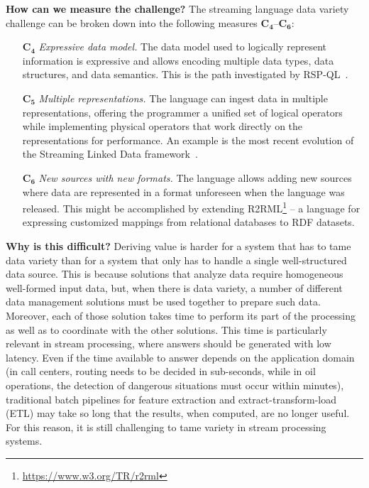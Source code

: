 \textbf{How can we measure the challenge?}
%
The streaming language data variety challenge can be broken down
into the following measures $\mathbf{C_4}$--$\mathbf{C_6}$:

\begin{itemize}[leftmargin=6mm]
  \item[$\mathbf{C_4}$] \emph{Expressive data model.}  The data model
    used to logically represent information is expressive and allows
    encoding multiple data types, data structures, and data
    semantics. This is the path investigated by
    RSP-QL~\cite{DellAglioDataScience2017,DBLP:conf/debs/ValleDM16}.
  \item[$\mathbf{C_5}$] \emph{Multiple representations.} The language
    can ingest data in multiple representations, offering the
    programmer a unified set of logical operators while implementing
    physical operators that work directly on the representations for
    performance. An example is the most recent evolution of the
    Streaming Linked Data framework~\cite{DBLP:conf/esws/BalduiniV017a}.
  \item[$\mathbf{C_6}$] \emph{New sources with new formats.} The
    language allows adding new sources where data are represented in a
    format unforeseen when the language was
    released. This might be accomplished by extending
    R2RML\footnote{\url{https://www.w3.org/TR/r2rml}} -- a language
    for expressing customized mappings from relational databases to
    RDF datasets.
\end{itemize}

\textbf{Why is this difficult?}
%
Deriving value is harder for a system that has to tame data variety
than for a system that only has to handle a single well-structured
data source. This is because solutions that analyze data require
homogeneous well-formed input data, but, when there is data variety,
a number of different data management solutions must be used together
to prepare such data. Moreover, each of those solution takes time to
perform its part of the processing as well as to coordinate with the
other solutions. This time is particularly relevant in stream
processing, where answers should be generated with low latency. Even
if the time available to answer depends on the application domain (in
call centers, routing needs to be decided in sub-seconds, while in oil
operations, the detection of dangerous situations must occur within
minutes), traditional batch pipelines for feature extraction and
extract-transform-load (ETL) may take so long that the results, when
computed, are no longer useful. For this reason, it is still
challenging to tame variety in stream processing systems.
